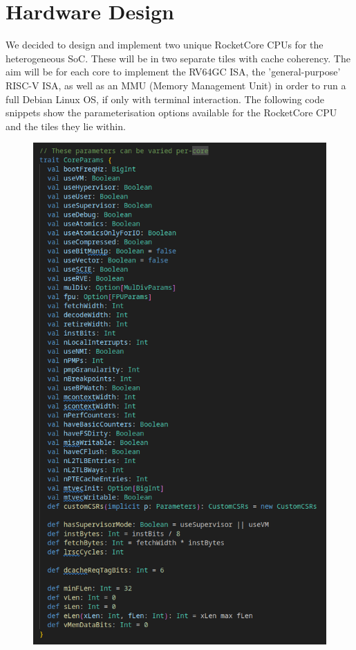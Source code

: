 \chapter{Hardware Design}
\label{ch:hw_design}
We decided to design and implement two unique RocketCore CPUs for the heterogeneous SoC. These will be in two separate tiles with cache coherency. The aim will be for each core to implement the RV64GC ISA, the 'general-purpose' RISC-V ISA, as well as an MMU (Memory Management Unit) in order to run a full Debian Linux OS, if only with terminal interaction. The following code snippets show the parameterisation options available for the RocketCore CPU and the tiles they lie within.

\begin{figure}
    \includegraphics[]{./img/core_params.png}
\end{figure}
